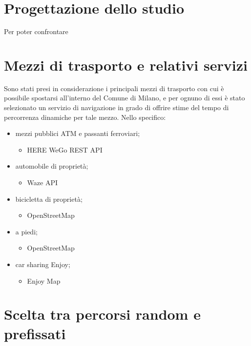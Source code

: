 \section{Progettazione dello studio}

Per poter confrontare 

\section{Mezzi di trasporto e relativi servizi}

Sono stati presi in considerazione i principali mezzi di trasporto con cui è possibile spostarsi all'interno del Comune di Milano, e per ognuno di essi è stato selezionato un servizio di navigazione in grado di offrire stime del tempo di percorrenza dinamiche per tale mezzo. Nello specifico:

\begin{itemize}
	\item mezzi pubblici ATM e passanti ferroviari;
	\begin{itemize}
		\item HERE WeGo REST API\cite{herewegoapi}
	\end{itemize}
	\item automobile di proprietà;
	\begin{itemize}
		\item Waze API\cite{wazeapi}
	\end{itemize}
	\item bicicletta di proprietà;
	\begin{itemize}
		\item OpenStreetMap\cite{openstreetmap}
	\end{itemize}
	\item a piedi;
	\begin{itemize}
		\item OpenStreetMap\cite{openstreetmap}
	\end{itemize}
	\item car sharing Enjoy;
	\begin{itemize}
		\item Enjoy Map\cite{enjoycarsharing}
	\end{itemize}
\end{itemize}

\section{Scelta tra percorsi random e prefissati}


